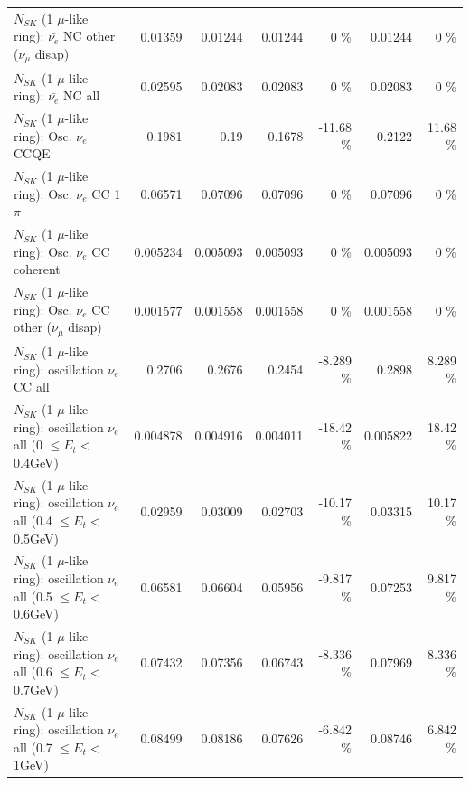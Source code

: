 \begin{table}
\begin{tabular}{| l | r | r | r  r | r  r |}
          $N_{SK}$ (1 $\mu$-like ring): $\bar{\nu_e}$ NC other ($\nu_\mu$ disap) &         0.01359 &         0.01244 &         0.01244 &        0 \%  &         0.01244 &        0 \%  \\ 
                            $N_{SK}$ (1 $\mu$-like ring): $\bar{\nu_{e}}$ NC all &         0.02595 &         0.02083 &         0.02083 &        0 \%  &         0.02083 &        0 \%  \\ 
\hline
\hline
\hline
                                 $N_{SK}$ (1 $\mu$-like ring): Osc. $\nu_e$ CCQE &          0.1981 &            0.19 &          0.1678 &   -11.68 \%  &          0.2122 &    11.68 \%  \\ 
                            $N_{SK}$ (1 $\mu$-like ring): Osc. $\nu_e$ CC 1$\pi$ &         0.06571 &         0.07096 &         0.07096 &        0 \%  &         0.07096 &        0 \%  \\ 
                          $N_{SK}$ (1 $\mu$-like ring): Osc. $\nu_e$ CC coherent &        0.005234 &        0.005093 &        0.005093 &        0 \%  &        0.005093 &        0 \%  \\ 
           $N_{SK}$ (1 $\mu$-like ring): Osc. $\nu_e$ CC other ($\nu_\mu$ disap) &        0.001577 &        0.001558 &        0.001558 &        0 \%  &        0.001558 &        0 \%  \\ 
                        $N_{SK}$ (1 $\mu$-like ring): oscillation $\nu_e$ CC all &          0.2706 &          0.2676 &          0.2454 &   -8.289 \%  &          0.2898 &    8.289 \%  \\ 
\hline
$N_{SK}$ (1 $\mu$-like ring): oscillation $\nu_{e}$ all (0 $\leq E_{t} <$ 0.4GeV) &        0.004878 &        0.004916 &        0.004011 &   -18.42 \%  &        0.005822 &    18.42 \%  \\ 
$N_{SK}$ (1 $\mu$-like ring): oscillation $\nu_{e}$ all (0.4 $\leq E_{t} <$ 0.5GeV) &         0.02959 &         0.03009 &         0.02703 &   -10.17 \%  &         0.03315 &    10.17 \%  \\ 
$N_{SK}$ (1 $\mu$-like ring): oscillation $\nu_{e}$ all (0.5 $\leq E_{t} <$ 0.6GeV) &         0.06581 &         0.06604 &         0.05956 &   -9.817 \%  &         0.07253 &    9.817 \%  \\ 
$N_{SK}$ (1 $\mu$-like ring): oscillation $\nu_{e}$ all (0.6 $\leq E_{t} <$ 0.7GeV) &         0.07432 &         0.07356 &         0.06743 &   -8.336 \%  &         0.07969 &    8.336 \%  \\ 
$N_{SK}$ (1 $\mu$-like ring): oscillation $\nu_{e}$ all (0.7 $\leq E_{t} <$ 1GeV) &         0.08499 &         0.08186 &         0.07626 &   -6.842 \%  &         0.08746 &    6.842 \%  \\ 

\end{tabular}
\end{table}
